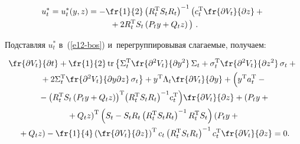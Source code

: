 \begin{multicols}{2}
\vspace*{-2pt}

\noindent
     \begin{multline}
     u_t^*= u_t^*(y,z)=-\fr{1}{2}\left( R_t^{\mathrm{T}} S_t R_t\right)^{-1} \left( c_t^{\mathrm{T}} 
\fr{\partial V_t}{\partial z} +{}\right.\\[-1pt]
\left.{}+2R_t^{\mathrm{T}} S_t\left( P_t y+Q_t z\right)
\vphantom{\fr{\partial V_t}{\partial z}}
\right)\,.
     \label{e13-bos}
     \end{multline} 
     
     \vspace*{-2pt}

     Подставляя $u_t^*$ в~(\ref{e12-bos}) и~перегруппировывая слагаемые, 
получаем:

\vspace*{-6pt}

     \begin{multline}
     \fr{\partial V_t}{\partial t} +\fr{1}{2}\,\mathrm{tr} \left\{ \Sigma_t^{\mathrm{T}} 
\fr{\partial^2 V_t}{\partial y^2}\,\Sigma_t +\sigma_t^{\mathrm{T}}\fr{\partial^2 V_t}{\partial 
z^2}\,\sigma_t +{}\right.\\
\left.{}+2\Sigma_t^{\mathrm{T}} \fr{\partial^2 V_t}{\partial y\partial 
z}\,\sigma_t\right\} +y^{\mathrm{T}} \Lambda_t\fr{\partial V_t}{\partial y}+ 
\left(
\vphantom{\left( R_t^{\mathrm{T}} S_t\left( P_t y+Q_tz\right)\right)^{\mathrm{T}}}
 y^{\mathrm{T}} a_t^{\mathrm{T}} -{}\right.\\
\!\left.{}-\left( R_t^{\mathrm{T}} S_t\left( P_t y+Q_tz\right)\right)^{\mathrm{T}}\! \left( 
R_t^{\mathrm{T}} S_t R_t\right)^{-1}\! c_t^{\mathrm{T}}\right) \!\fr{\partial V_t}{\partial z}+
 \left( P_t y+{}\right.\hspace*{-3.5019pt}\\
\left. {}+Q_t z\right)^{\mathrm{T}} \left( S_t -S_t R_t\left( R_t^{\mathrm{T}} S_t 
R_t\right)^{-1} R_t^{\mathrm{T}} S_t\right) \left( P_t y+{}\right.\\
\!\!\!\left.{}+Q_t z\right)-\fr{1}{4}\left(\fr{\partial V_t}{\partial z}\right)^{\mathrm{T}} c_t 
     \left( R_t^{\mathrm{T}} S_t R_t\right)^{-1} c_t^{\mathrm{T}} \fr{\partial V_t}{\partial z}=0.\!\!\!
     \label{e14-bos}
     \end{multline}
     

\end{multicols}

